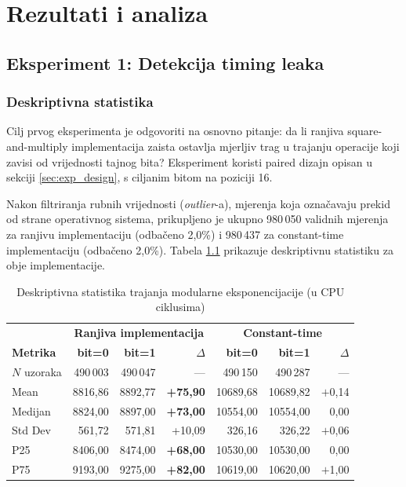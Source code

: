 
\chapter{Rezultati i analiza}
\label{ch:rezultati}

\section{Eksperiment 1: Detekcija timing leaka}

\subsection{Deskriptivna statistika}

Cilj prvog eksperimenta je odgovoriti na osnovno pitanje: da li ranjiva square-and-multiply implementacija zaista ostavlja mjerljiv trag u trajanju operacije koji zavisi od vrijednosti tajnog bita? Eksperiment koristi paired dizajn opisan u sekciji \ref{sec:exp_design}, s ciljanim bitom na poziciji 16.

Nakon filtriranja rubnih vrijednosti (\textit{outlier}-a), mjerenja koja označavaju prekid od strane operativnog sistema, prikupljeno je ukupno 980\,050 validnih mjerenja za ranjivu implementaciju (odbačeno 2{,}0\%) i 980\,437 za constant-time implementaciju (odbačeno 2{,}0\%). Tabela \ref{tab:desc_stats} prikazuje deskriptivnu statistiku za obje implementacije.

\begin{table}[H]
\centering
\caption{Deskriptivna statistika trajanja modularne eksponencijacije (u CPU ciklusima)}
\label{tab:desc_stats}
\begin{tabular}{lrrr|rrr}
\toprule
 & \multicolumn{3}{c|}{\textbf{Ranjiva implementacija}} & \multicolumn{3}{c}{\textbf{Constant-time}} \\
\textbf{Metrika} & \textbf{bit=0} & \textbf{bit=1} & \textbf{$\Delta$} & \textbf{bit=0} & \textbf{bit=1} & \textbf{$\Delta$} \\
\midrule
$N$ uzoraka  & 490\,003  & 490\,047  & ---    & 490\,150  & 490\,287  & --- \\
Mean         & 8816{,}86 & 8892{,}77 & \textbf{+75{,}90} & 10689{,}68 & 10689{,}82 & $+$0{,}14 \\
Medijan     & 8824{,}00 & 8897{,}00 & \textbf{+73{,}00} & 10554{,}00 & 10554{,}00 & 0{,}00 \\
Std Dev      & 561{,}72  & 571{,}81  & +10{,}09  & 326{,}16  & 326{,}22  & $+$0{,}06 \\
P25          & 8406{,}00 & 8474{,}00 & \textbf{+68{,}00} & 10530{,}00 & 10530{,}00 & 0{,}00 \\
P75          & 9193{,}00 & 9275{,}00 & \textbf{+82{,}00} & 10619{,}00 & 10620{,}00 & $+$1{,}00 \\
\bottomrule
\end{tabular}
\end{table}

